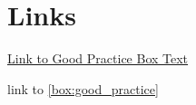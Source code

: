 %
%
%
\chapter{Links}


\hyperlink{htbox:good_practice}{Link to Good Practice Box Text}

link to \autoref{box:good_practice}
